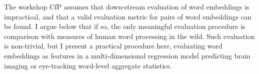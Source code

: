 The workshop CfP assumes that down-stream evaluation of word embeddings is impractical, and that a valid evaluation metric for pairs of word embeddings can be found. I argue below that if so, the only meaningful evaluation procedure is comparison with measures of human word processing in the wild. Such evaluation is non-trivial, but I present a practical procedure here, evaluating word embeddings as features in a multi-dimensional regression model predicting brain imaging or eye-tracking word-level aggregate statistics.
